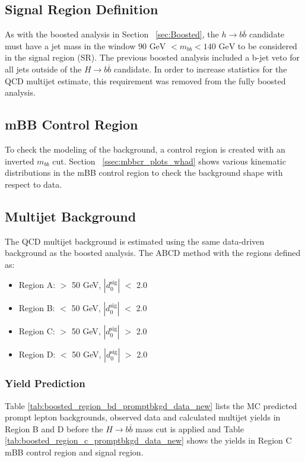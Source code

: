 \subsection{Signal Region Definition}
As with the boosted analysis in Section ~\ref{sec:Boosted}, the ${h\rightarrow b\overline{b}}$ candidate must have a jet mass in the window ${90 \text{ GeV } < m_{bb} < 140 \text{ GeV}}$ to be considered in the signal region (SR). The previous boosted analysis included a b-jet veto for all jets outside of the ${H\rightarrow b\overline{b}}$ candidate. In order to increase statistics for the QCD multijet estimate, this requirement was removed from the fully boosted analysis.

\subsection{mBB Control Region}
To check the modeling of the background, a control region is created with an inverted ${m_{bb}}$ cut. Section ~\ref{ssec:mbbcr_plots_whad} shows various kinematic distributions in  the mBB control region to check the background shape with respect to data.
\subsection{Multijet Background}
The QCD multijet background is estimated using the same data-driven background as the boosted analysis. The ABCD method with the regions defined as:
\begin{itemize}
\item Region A: \met $>$ 50 GeV, $|d_{0}^{\textrm{sig}}|$ $<$ 2.0
\item Region B: \met $<$ 50 GeV, $|d_{0}^{\textrm{sig}}|$ $<$ 2.0
\item Region C: \met $>$ 50 GeV, $|d_{0}^{\textrm{sig}}|$ $>$ 2.0
\item Region D: \met $<$ 50 GeV, $|d_{0}^{\textrm{sig}}|$ $>$ 2.0
\end{itemize}

\subsubsection{Yield Prediction}
Table \ref{tab:boosted_region_bd_promptbkgd_data_new} lists the MC predicted prompt lepton backgrounds, observed data and calculated multijet yields in Region B and D before the ${H\rightarrow b\overline{b}}$ mass cut is applied and Table \ref{tab:boosted_region_c_promptbkgd_data_new} shows the yields in Region C mBB control region and signal region.

